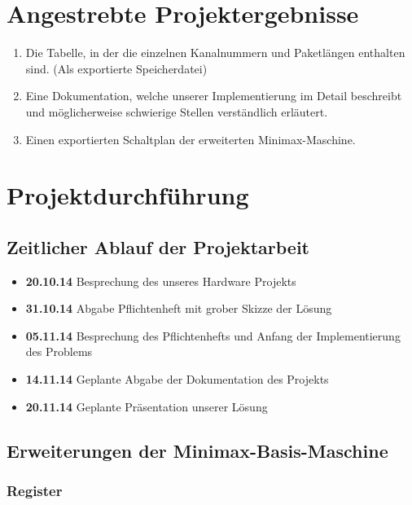 \documentclass[12pt,titlepage]{article}
\begin{document}
\section{Angestrebte Projektergebnisse}
\begin{enumerate}
\item Die Tabelle, in der die einzelnen Kanalnummern und Paketl{\"a}ngen enthalten sind. (Als exportierte Speicherdatei)
\item Eine Dokumentation, welche unserer Implementierung im Detail beschreibt und m{\"o}glicherweise schwierige Stellen verst{\"a}ndlich erl{\"a}utert.
\item Einen exportierten Schaltplan der erweiterten Minimax-Maschine.
\end{enumerate}

\section{Projektdurchf{\"u}hrung}

\subsection{Zeitlicher Ablauf der Projektarbeit}

\begin{itemize}
\item [] \textbf{20.10.14} Besprechung des unseres Hardware Projekts
\item [] \textbf{31.10.14} Abgabe Pflichtenheft mit grober Skizze der L{\"o}sung
\item [] \textbf{05.11.14} Besprechung des Pflichtenhefts und Anfang der Implementierung des Problems
\item [] \textbf{14.11.14} Geplante Abgabe der Dokumentation des Projekts
\item [] \textbf{20.11.14} Geplante Pr{\"a}sentation unserer Lösung
\end{itemize}

\subsection{Erweiterungen der Minimax-Basis-Maschine}

\subsubsection{Register}
\end{document}
